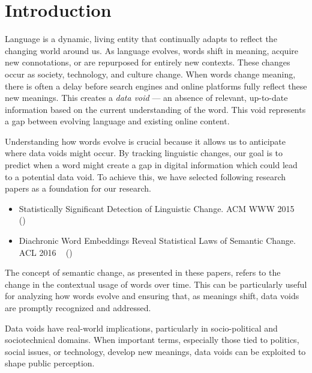 
\section{Introduction} \label{sec:introduction}
Language is a dynamic, living entity that continually adapts to reflect the changing world around us.
As language evolves, words shift in meaning, acquire new connotations, or are repurposed for entirely new contexts.
These changes occur as society, technology, and culture change.
When words change meaning, there is often a delay before search engines and online platforms fully reflect these new meanings.
This creates a \emph{data void} — an absence of relevant, up-to-date information based on the current understanding of the word.
This void represents a gap between evolving language and existing online content.

Understanding how words evolve is crucial because it allows us to anticipate where data voids might occur.
By tracking linguistic changes, our goal is to predict when a word might create a gap in digital information which could lead to a potential data void.
To achieve this, we have selected following research papers as a foundation for our research.

\begin{itemize}
    \item Statistically Significant Detection of Linguistic Change.
    ACM WWW 2015 ~\cite{kulkarni2014statisticallysignificantdetectionlinguistic} ()
    \item Diachronic Word Embeddings Reveal Statistical Laws of Semantic Change.
    ACL 2016 ~\cite{hamilton-etal-2016-diachronic} ()
\end{itemize}

The concept of semantic change, as presented in these papers, refers to the change in the contextual usage of words over time.
This can be particularly useful for analyzing how words evolve and ensuring that, as meanings shift, data voids are promptly recognized and addressed.

Data voids have real-world implications, particularly in socio-political and sociotechnical domains.
When important terms, especially those tied to politics, social issues, or technology, develop new meanings,
data voids can be exploited to shape public perception.

